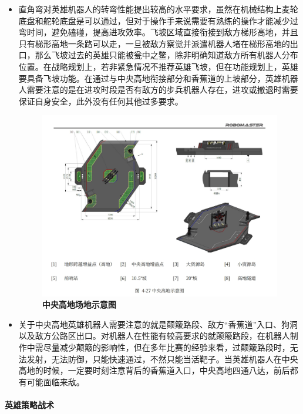 \begin{itemize}
                \item 直角弯对英雄机器人的转弯性能提出较高的水平要求，虽然在机械结构上麦轮底盘和舵轮底盘是可以通过，但对于操作手来说需要有熟练的操作才能减少过弯时间，避免磕碰，提高进攻效率。飞坡区域直接衔接到敌方梯形高地，并且只有梯形高地一条路可以走，一旦被敌方察觉并派遣机器人堵在梯形高地的出口，那么飞坡过去的英雄只能被瓮中之鳖，除非明确知道敌方所有机器人分布位置。在战略规划上，若非紧急情况不推荐英雄飞坡，但在功能规划上，英雄要具备飞坡功能。在通过与中央高地衔接部分和香蕉道的上坡部分，英雄机器人需要注意的是在进攻时段是否有敌方的步兵机器人存在，进攻或撤退时需要保证自身安全，此外没有任何其他过多要求。
    
    
                \begin{figure}[H]
                    \centering
                    \includegraphics[height=0.35\textwidth]{figure/centralTableland.png}
                    \hspace{0.5em}
                    \caption{\textbf{\textbf{中央高地场地示意图}}}
                    \label{fig:centralTableland}
                \end{figure}
    
                \item 关于中央高地英雄机器人需要注意的就是颠簸路段、敌方“香蕉道”入口、狗洞以及敌方公路区出口。对机器人在性能有较高要求的就颠簸路段，在机器人制作中需尽量减少颠簸的影响性，但在多年比赛的经验来看，过颠簸路段时，无法发射，无法防御，只能快速通过，不然只能当活靶子。当英雄机器人在中央高地的时候，一定要时刻注意背后的香蕉道入口，中央高地四通八达，前后都有可能面临来敌。
    
            \end{itemize}

        \paragraph{英雄策略战术}

    

